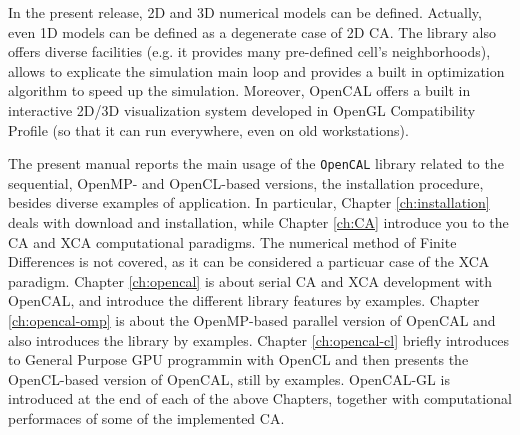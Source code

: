 In the present release, 2D and 3D numerical models can be
defined. Actually, even 1D models can be defined as a degenerate case
of 2D CA. The library also offers diverse facilities (e.g. it provides
many pre-defined cell's neighborhoods), allows to explicate the
simulation main loop and provides a built in optimization algorithm
to speed up the simulation. Moreover, OpenCAL offers a built in
interactive 2D/3D visualization system developed in OpenGL
Compatibility Profile (so that it can run everywhere, even on old
workstations).

The present manual reports the main usage of the \verb'OpenCAL'
library related to the sequential, OpenMP- and OpenCL-based versions,
the installation procedure, besides diverse examples of
application. In particular, Chapter \ref{ch:installation} deals with
download and installation, while Chapter \ref{ch:CA} introduce you to
the CA and XCA computational paradigms. The numerical method of Finite
Differences is not covered, as it can be considered a particuar case
of the XCA paradigm. Chapter \ref{ch:opencal} is about serial CA and
XCA development with OpenCAL, and introduce the different library
features by examples. Chapter \ref{ch:opencal-omp} is about the
OpenMP-based parallel version of OpenCAL and also introduces the
library by examples. Chapter \ref{ch:opencal-cl} briefly introduces to
General Purpose GPU programmin with OpenCL and then presents the
OpenCL-based version of OpenCAL, still by examples. OpenCAL-GL is
introduced at the end of each of the above Chapters, together with
computational performaces of some of the implemented CA.

